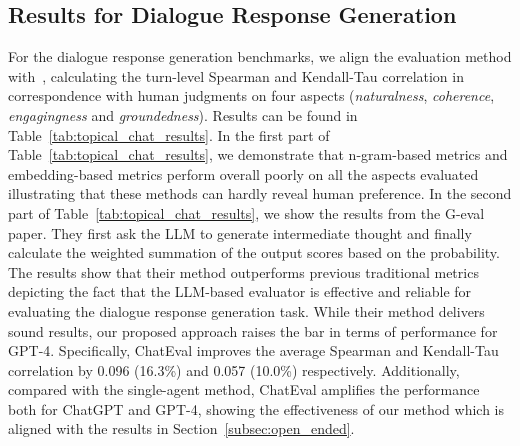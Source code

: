 \subsection{Results for Dialogue Response Generation}
For the dialogue response generation benchmarks, we align the evaluation method with~\cite{zhong2022towards}, calculating the turn-level Spearman and Kendall-Tau correlation in correspondence with human judgments on four aspects (\textit{naturalness}, \textit{coherence}, \textit{engagingness} and \textit{groundedness}). Results can be found in Table~\ref{tab:topical_chat_results}. In the first part of Table~\ref{tab:topical_chat_results}, we demonstrate that n-gram-based metrics and embedding-based metrics perform overall poorly on all the aspects evaluated illustrating that these methods can hardly reveal human preference. In the second part of Table~\ref{tab:topical_chat_results}, we show the results from the G-eval~\citep{liu2023gpteval} paper. They first ask the LLM to generate intermediate thought and finally calculate the weighted summation of the output scores based on the probability. The results show that their method outperforms previous traditional metrics depicting the fact that the LLM-based evaluator is effective and reliable for evaluating the dialogue response generation task. While their method delivers sound results, our proposed approach raises the bar in terms of performance for GPT-4. Specifically, ChatEval improves the average Spearman and Kendall-Tau correlation by 0.096 (16.3\%) and 0.057 (10.0\%) respectively. Additionally, compared with the single-agent method, ChatEval amplifies the performance both for ChatGPT and GPT-4, showing the effectiveness of our method which is aligned with the results in Section~\ref{subsec:open_ended}.


